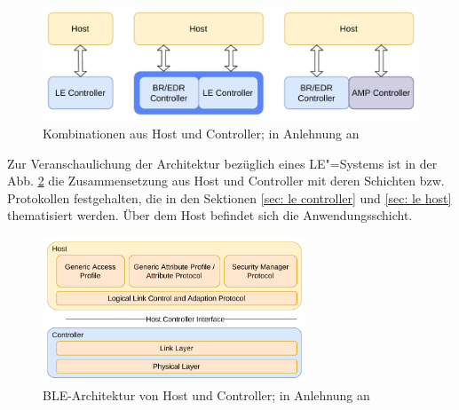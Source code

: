 \begin{figure}
    \centering
    \includegraphics[width=0.9\linewidth]{graphics/kombination_host_controller.pdf}
    \caption[Kombinationen aus Host und Controller]{Kombinationen aus Host und Controller; in Anlehnung an \cite{BtSpec4.0_fig_124}}
    \label{fig: kombinationen aus host und controller}
\end{figure}

Zur Veranschaulichung der Architektur bezüglich eines LE"=Systems ist in der Abb. \ref{fig: host controller architektur} die Zusammensetzung aus Host und Controller mit deren Schichten bzw. Protokollen festgehalten, die in den Sektionen \ref{sec: le controller} und \ref{sec: le host} thematisiert werden. Über dem Host befindet sich die Anwendungsschicht.

\begin{figure}
    \centering
    \includegraphics[width=0.7\textwidth]{graphics/host_controller_hci.pdf}
    \caption[BLE-Architektur von Host und Controller]{BLE-Architektur von Host und Controller; in Anlehnung an \cite{BtSpec4.0_fig_137}}
    \label{fig: host controller architektur}
\end{figure}